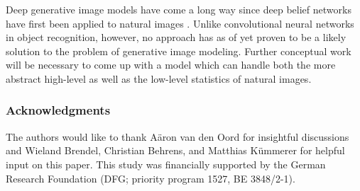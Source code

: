 \documentclass{article}
\begin{document}
		Deep generative image models have come a long way since deep belief
		networks have first been applied to natural images \cite{Osindero:2008}. Unlike convolutional neural networks in object recognition,
		however, no approach has as of yet proven to be a likely solution to the problem of
		generative image modeling. Further conceptual work will be necessary to come up with a model
		which can handle both the more abstract high-level as well as the low-level statistics of natural images.

	\subsubsection*{Acknowledgments}
		The authors would like to thank Aäron van den Oord for insightful discussions and Wieland Brendel,
		Christian Behrens, and Matthias Kümmerer for helpful input on this paper. This study was
		financially supported by the German Research Foundation (DFG; priority program 1527, BE 3848/2-1).

	
	
\end{document}
